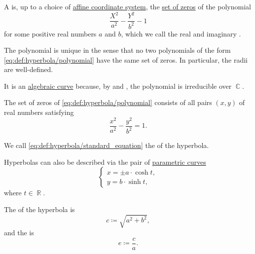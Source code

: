 \begin{definition}\label{def:hyperbola}
  A  is, up to a choice of \hyperref[def:affine_coordinate_system]{affine coordinate system}, the \hyperref[def:root_of_polynomial]{set of zeros} of the polynomial
  \begin{equation}\label{eq:def:hyperbola/polynomial}
    \frac {X^2} {a^2} - \frac {Y^2} {b^2} - 1
  \end{equation}
  for some positive real numbers \( a \) and \( b \), which we call the real and imaginary .

  The polynomial is unique in the sense that no two polynomials of the form \eqref{eq:def:hyperbola/polynomial} have the same set of zeros. In particular, the radii are well-defined.

  It is an \hyperref[def:affine_algebraic_set/curve]{algebraic curve} because, by  and , the polynomial is irreducible over \( \BbbC \).

  \begin{thmenum}
     The set of zeros of \eqref{eq:def:hyperbola/polynomial} consists of all pairs \( (x, y) \) of real numbers satisfying
    \begin{equation}\label{eq:def:hyperbola/standard_equation}
      \frac {x^2} {a^2} - \frac {y^2} {b^2} = 1.
    \end{equation}

    We call \eqref{eq:def:hyperbola/standard_equation} the  of the hyperbola.

     Hyperbolas can also be described via the pair of \hyperref[def:parametric_curve]{parametric curves}
    \begin{equation}\label{eq:def:hyperbola/parametric_equation}
      \begin{cases}
        x = \pm a \cdot \cosh t, \\
        y = b \cdot \sinh t,
      \end{cases}
    \end{equation}
    where \( t \in \BbbR \).

     The  of the hyperbola is
    \begin{equation*}
      c \coloneq \sqrt{ a^2 + b^2 },
    \end{equation*}
    and the  is
    \begin{equation*}
      e \coloneqq \frac c a.
    \end{equation*}


\end{thmenum}
\end{definition}
